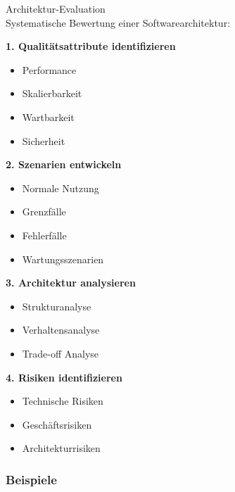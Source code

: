 \begin{KR}{Architektur-Evaluation}\\
Systematische Bewertung einer Softwarearchitektur:

\textbf{1. Qualitätsattribute identifizieren}
\begin{itemize}
    \item Performance
    \item Skalierbarkeit
    \item Wartbarkeit
    \item Sicherheit
\end{itemize}

\textbf{2. Szenarien entwickeln}
\begin{itemize}
    \item Normale Nutzung
    \item Grenzfälle
    \item Fehlerfälle
    \item Wartungsszenarien
\end{itemize}

\textbf{3. Architektur analysieren}
\begin{itemize}
    \item Strukturanalyse
    \item Verhaltensanalyse
    \item Trade-off Analyse
\end{itemize}

\textbf{4. Risiken identifizieren}
\begin{itemize}
    \item Technische Risiken
    \item Geschäftsrisiken
    \item Architekturrisiken
\end{itemize}
\end{KR}

\columnbreak

\subsubsection{Beispiele}

